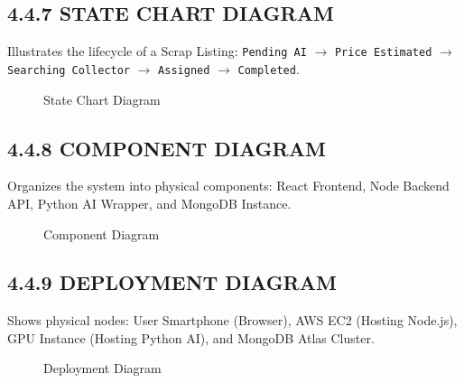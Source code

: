 \subsection{4.4.7 STATE CHART DIAGRAM}
Illustrates the lifecycle of a Scrap Listing: \texttt{Pending AI} $\rightarrow$ \texttt{Price Estimated} $\rightarrow$ \texttt{Searching Collector} $\rightarrow$ \texttt{Assigned} $\rightarrow$ \texttt{Completed}.
\begin{figure}[H]
    \centering
    \vspace{4cm}
    \caption{State Chart Diagram}
\end{figure}

\subsection{4.4.8 COMPONENT DIAGRAM}
Organizes the system into physical components: React Frontend, Node Backend API, Python AI Wrapper, and MongoDB Instance.
\begin{figure}[H]
    \centering
    \vspace{4cm}
    \caption{Component Diagram}
\end{figure}

\subsection{4.4.9 DEPLOYMENT DIAGRAM}
Shows physical nodes: User Smartphone (Browser), AWS EC2 (Hosting Node.js), GPU Instance (Hosting Python AI), and MongoDB Atlas Cluster.
\begin{figure}[H]
    \centering
    \vspace{4cm}
    \caption{Deployment Diagram}
\end{figure}
